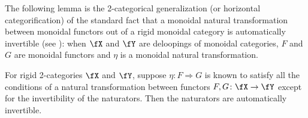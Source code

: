 \documentclass[12pt,reqno]{amsart}
\begin{document}
The following lemma is the 2-categorical generalization (or horizontal categorification) of the standard fact that a monoidal natural transformation between monoidal functors out of a rigid monoidal category is automatically invertible (see \cite[\S2.10]{EGNO15}): when $\fX$ and $\fY$ are deloopings of monoidal categories, $F$ and $G$ are monoidal functors and $\eta$ is a monoidal natural transformation. 

\begin{lemma}
\label{autounitary}
For rigid 2-categories $\fX$ and $\fY$, suppose $\eta \colon F \Rightarrow G$ is known to satisfy all the conditions of a natural transformation between functors $F, G \colon \fX \to \fY$ except for the invertibility of the naturators. Then the naturators are automatically invertible. 
\end{lemma}
\end{document}
